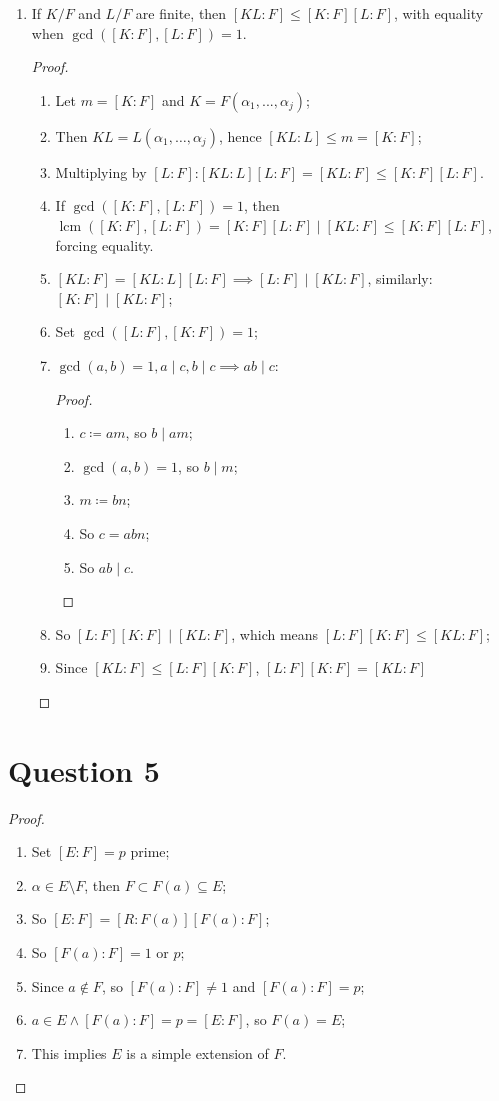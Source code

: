 \documentclass[12pt]{article}
\begin{document}
\begin{enumerate}
\item If $K/F$ and $L/F$ are finite, then $[KL:F]\le [K:F][L:F]$, with equality when $\gcd([K:F],[L:F])=1$.
\begin{proof}
    ~
    \begin{enumerate}
\item Let $m=[K:F]$ and $K=F(\alpha_1,...,\alpha_j)$;
\item Then $KL=L(\alpha_1,\dots,\alpha_j)$, hence $[KL:L]\leq m=[K:F]$;
\item Multiplying by $[L:F]$:$[KL:L][L:F]=[KL:F]\le [K:F][L:F]$.
\item If $\gcd([K:F],[L:F])=1$, then $\operatorname{lcm}([K:F],[L:F])=[K:F][L:F]\mid [KL:F]\le [K:F][L:F]$, forcing equality.
\item $[KL:F]=[KL:L][L:F]\implies [L:F]\mid [KL:F]$, similarly: $[K:F]\mid [KL:F]$;
\item Set $\gcd([L:F],[K:F])=1$;
\item $\gcd(a,b)=1,a\mid c,b\mid c\implies ab\mid c$:
\begin{proof}
    ~
    \begin{enumerate}
        \item $c\coloneqq am$, so $b\mid am$;
        \item $\gcd(a,b)=1$, so $b\mid m$;
        \item $m\coloneqq bn$;
        \item So $c=abn$;
        \item So $ab\mid c$.
    \end{enumerate}
\end{proof}
\item So $[L:F][K:F]\mid [KL:F]$, which means $[L:F][K:F]\leq [KL:F]$;
\item Since $[KL:F]\leq [L:F][K:F]$, $[L:F][K:F]=[KL:F]$
\end{enumerate}
\end{proof}
\end{enumerate}

\newpage

\section*{Question 5}
\begin{proof}
    ~
    \begin{enumerate}
        \item Set $[E:F]=p$ prime;
        \item $\alpha \in E\setminus F$, then $F\subset F(a)\subseteq E$;
        \item So $[E:F]=[R:F(a)][F(a):F]$;
        \item So $[F(a):F]=1$ or $p$;
        \item Since $a\notin F$, so $[F(a):F]\ne1$ and $[F(a):F]=p$;
        \item $a\in E \land [F(a):F]=p=[E:F]$, so $F(a)=E$;
        \item This implies $E$ is a simple extension of $F$.
    \end{enumerate}
\end{proof}
\end{document}
